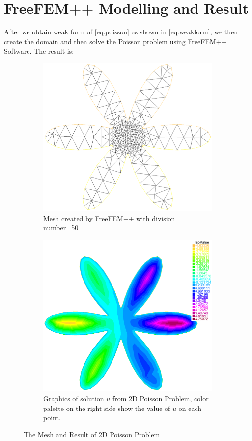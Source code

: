 \documentclass[a4paper,12pt]{article}
\begin{document}
\section{FreeFEM++ Modelling and Result}
After we obtain weak form of \eqref{eq:poisson} as shown in \eqref{eq:weakform}, we then create the domain and then solve the Poisson problem using FreeFEM++ Software. The result is:
\begin{figure}[h!]
	\begin{subfigure}[b]{0.5\linewidth}
		\centering
		\includegraphics[width=0.9\linewidth]{picture/poisson2d}
		\caption{Mesh created by FreeFEM++ with division number=50}
		\label{fig:mesh}
	\end{subfigure}
	\quad
	\begin{subfigure}[b]{0.5\linewidth}
		\centering
		\includegraphics[width=0.9\linewidth]{picture/vectoru}
		\caption{Graphics of solution $u$ from 2D Poisson Problem, color palette on the right side show the value of $u$ on each point.}
		\label{fig:solution}
	\end{subfigure}
	\caption{The Mesh and Result of 2D Poisson Problem}
	\label{fig:result}
\end{figure}
\end{document}
